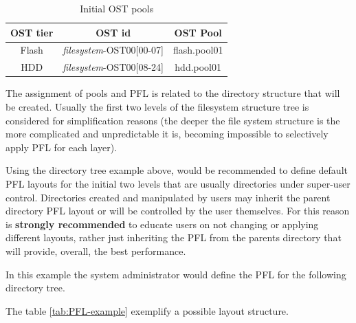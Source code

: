 \documentclass{article}
\begin{document}
\begin{table}[h]
\centering
 \begin{tabular}{||c c c||} 
 \hline
 OST tier & OST id & OST Pool \\ [0.5ex] 
 \hline\hline
 Flash &\textit{filesystem}-OST00[00-07] & flash.pool01 \\ 
 \hline
HDD & \textit{filesystem}-OST00[08-24] & hdd.pool01 \\ 
 \hline
 \end{tabular}
 \caption{Initial OST pools}
 \label{tab:initial-ost-pools}
\end{table}

The assignment of pools and PFL is related to the directory structure that will be created. Usually the first two levels of the filesystem structure tree is considered for simplification reasons (the deeper the file system structure is the more complicated and unpredictable it is, becoming impossible to selectively apply PFL for each layer). 
\vspace{5mm}

Using the directory tree example above, would be recommended to define default PFL layouts for the initial two levels that are usually directories under super-user control. Directories created and manipulated by users may inherit the parent directory PFL layout or will be controlled by the user themselves. For this reason is \textbf{strongly recommended} to educate users on not changing or applying different layouts, rather just inheriting the PFL from the parents directory that will provide, overall, the best performance.

In this example the system administrator would define the PFL for the following directory tree.
\vspace{5mm}

The table \ref{tab:PFL-example} exemplify a possible layout structure.
\end{document}
